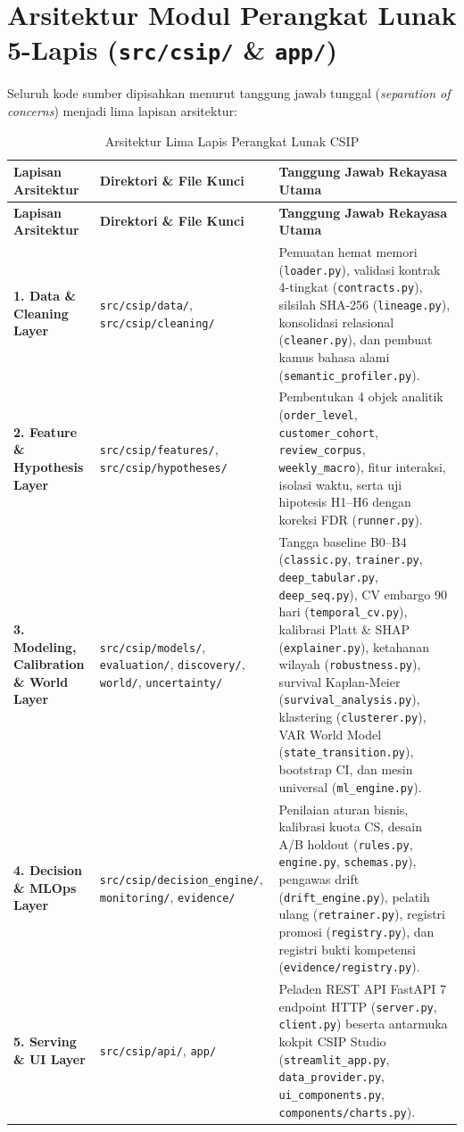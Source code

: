 \documentclass[11pt,a4paper,oneside]{book}
\newcommand{\code}[1]{{\small\nolinkurl{#1}}}
\begin{document}
\section{Arsitektur Modul Perangkat Lunak 5-Lapis (\texttt{src/csip/} \& \texttt{app/})}

Seluruh kode sumber dipisahkan menurut tanggung jawab tunggal (\emph{separation of concerns}) menjadi lima lapisan arsitektur:

\begin{longtable}{@{} >{\raggedright\arraybackslash}p{3.3cm} >{\raggedright\arraybackslash}p{4.6cm} >{\raggedright\arraybackslash}p{7.9cm} @{}}
\caption{Arsitektur Lima Lapis Perangkat Lunak CSIP} \\
\toprule
\textbf{Lapisan Arsitektur} & \textbf{Direktori \& File Kunci} & \textbf{Tanggung Jawab Rekayasa Utama} \\
\midrule
\endfirsthead
\toprule
\textbf{Lapisan Arsitektur} & \textbf{Direktori \& File Kunci} & \textbf{Tanggung Jawab Rekayasa Utama} \\
\midrule
\endhead
\bottomrule
\endfoot
\textbf{1. Data \& Cleaning Layer} & \code{src/csip/data/}, \code{src/csip/cleaning/} & Pemuatan hemat memori (\code{loader.py}), validasi kontrak 4-tingkat (\code{contracts.py}), silsilah SHA-256 (\code{lineage.py}), konsolidasi relasional (\code{cleaner.py}), dan pembuat kamus bahasa alami (\code{semantic_profiler.py}). \\
\textbf{2. Feature \& Hypothesis Layer} & \code{src/csip/features/}, \code{src/csip/hypotheses/} & Pembentukan 4 objek analitik (\code{order_level}, \code{customer_cohort}, \code{review_corpus}, \code{weekly_macro}), fitur interaksi, isolasi waktu, serta uji hipotesis H1--H6 dengan koreksi FDR (\code{runner.py}). \\
\textbf{3. Modeling, Calibration \& World Layer} & \code{src/csip/models/}, \code{evaluation/}, \code{discovery/}, \code{world/}, \code{uncertainty/} & Tangga baseline B0--B4 (\code{classic.py}, \code{trainer.py}, \code{deep_tabular.py}, \code{deep_seq.py}), CV embargo 90 hari (\code{temporal_cv.py}), kalibrasi Platt \& SHAP (\code{explainer.py}), ketahanan wilayah (\code{robustness.py}), survival Kaplan-Meier (\code{survival_analysis.py}), klastering (\code{clusterer.py}), VAR World Model (\code{state_transition.py}), bootstrap CI, dan mesin universal (\code{ml_engine.py}). \\
\textbf{4. Decision \& MLOps Layer} & \code{src/csip/decision_engine/}, \code{monitoring/}, \code{evidence/} & Penilaian aturan bisnis, kalibrasi kuota CS, desain A/B holdout (\code{rules.py}, \code{engine.py}, \code{schemas.py}), pengawas drift (\code{drift_engine.py}), pelatih ulang (\code{retrainer.py}), registri promosi (\code{registry.py}), dan registri bukti kompetensi (\code{evidence/registry.py}). \\
\textbf{5. Serving \& UI Layer} & \code{src/csip/api/}, \code{app/} & Peladen REST API FastAPI 7 endpoint HTTP (\code{server.py}, \code{client.py}) beserta antarmuka kokpit CSIP Studio (\code{streamlit_app.py}, \code{data_provider.py}, \code{ui_components.py}, \code{components/charts.py}). \\
\end{longtable}
\end{document}
